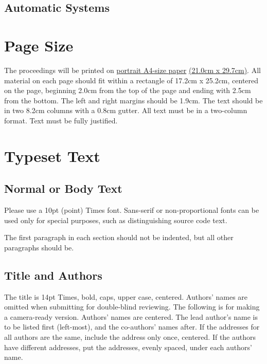 \documentclass{article}
\begin{document}
\subsection{Automatic Systems}



\section{Page Size}\label{sec:page_size}

The proceedings will be printed on
 \underline{portrait A4-size paper} \underline{(21.0cm x 29.7cm)}.
All material on each page should fit within a rectangle of 17.2cm x 25.2cm,
centered on the page, beginning 2.0cm
from the top of the page and ending with 2.5cm from the bottom.
The left and right margins should be 1.9cm.
The text should be in two 8.2cm columns with a 0.8cm gutter.
All text must be in a two-column format.
Text must be fully justified.

\section{Typeset Text}\label{sec:typeset_text}

\subsection{Normal or Body Text}\label{subsec:body}

Please use a 10pt (point) Times font. Sans-serif or non-proportional fonts
can be used only for special purposes, such as distinguishing source code text.

The first paragraph in each section should not be indented, but all other paragraphs should be.

\subsection{Title and Authors}

The title is 14pt Times, bold, caps, upper case, centered.
Authors' names are omitted when submitting for double-blind reviewing.
The following is for making a camera-ready version.
Authors' names are centered.
The lead author's name is to be listed first (left-most), and the co-authors' names after.
If the addresses for all authors are the same, include the address only once, centered.
If the authors have different addresses, put the addresses, evenly spaced, under each authors' name.
\end{document}
